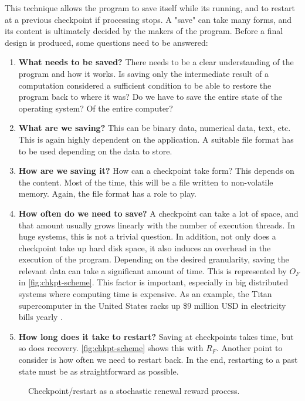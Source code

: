 {This technique allows the program to save itself while its running, and to restart at a previous checkpoint if processing stops. A "save" can take many forms, and its content is ultimately decided by the makers of the program. Before a final design is produced, some questions need to be answered:
\begin{enumerate}
	\item \textbf{What needs to be saved?} There needs to be a clear understanding of the program and how it works. Is saving only the intermediate result of a computation considered a sufficient condition to be able to restore the program back to where it was? Do we have to save the entire state of the operating system? Of the entire computer? 
	\item \textbf{What are we saving?} This can be binary data, numerical data, text, etc. This is again highly dependent on the application. A suitable file format has to be used depending on the data to store.
	\item \textbf{How are we saving it?} How can a checkpoint take form? This depends on the content. Most of the time, this will be a file written to non-volatile memory. Again, the file format has a role to play.
	\item \textbf{How often do we need to save?} A checkpoint can take a lot of space, and that amount usually grows linearly with the number of execution threads. In huge systems, this is not a trivial question. In addition, not only does a checkpoint take up hard disk space, it also induces an overhead in the execution of the program. Depending on the desired granularity, saving the relevant data can take a significant amount of time. This is represented by $O_F$ in \autoref{fig:chkpt-scheme}. This factor is important, especially in big distributed systems where computing time is expensive. As an example, the Titan supercomputer in the United States racks up \$9 million USD in electricity bills yearly \cite{online:henn}.
	\item \textbf{How long does it take to restart?} Saving at checkpoints takes time, but so does recovery. \autoref{fig:chkpt-scheme} shows this with $R_F$. Another point to consider is how often we need to restart back. In the end, restarting to a past state must be as straightforward as possible.
\end{enumerate}
\begin{figure}[H]
	\centering
	
	\caption{Checkpoint/restart as a stochastic renewal reward process.}
	\label{fig:chkpt-scheme}
\end{figure}

}
